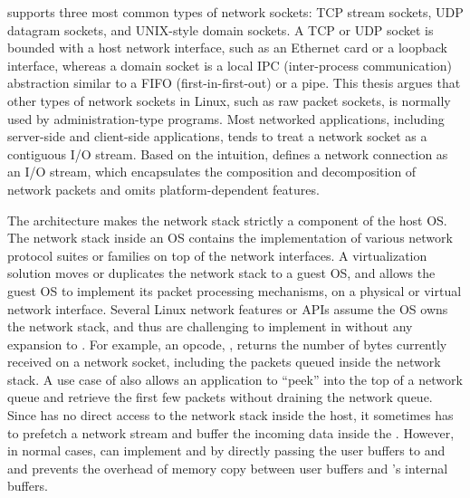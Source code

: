 \label{sec:libos:socket}

\thelibos{} supports three most common types of network sockets: TCP stream sockets, UDP datagram sockets, and UNIX-style domain sockets.
A TCP or UDP socket is bounded with a host network interface,
such as an Ethernet card or a loopback interface,
whereas a domain socket is a local IPC (inter-process communication) abstraction
similar to a FIFO (first-in-first-out) or a pipe.
This thesis argues that other types of network sockets
in Linux, such as raw packet sockets, is normally used by administration-type programs.
Most networked applications, including server-side and client-side applications, tends to treat a network socket
as a contiguous I/O stream. Based on the intuition,
\thehostabi{} defines a network connection as an I/O stream, which encapsulates the composition and decomposition of network packets
and omits platform-dependent features.

The \graphene{} architecture makes the network stack strictly a component of the host OS.
The network stack inside an OS contains the implementation of various network protocol suites or families on top of the network interfaces.
A virtualization solution moves or duplicates
the network stack to a guest OS,
and allows the guest OS to implement its packet processing mechanisms,
on a physical or virtual network interface.
Several Linux network features or APIs assume
the OS owns the network stack, and thus are challenging to implement in \thelibos{}
without any expansion to \thehostabi{}.
For example,
an  opcode, ,
returns the number of bytes currently received on a network socket, including the packets queued inside the network stack. 
A use case of  also allows an application
to ``peek'' into the top of a network queue
and retrieve the first few packets without draining the network queue.
Since \thelibos{} has no direct access to the network stack
inside the host,
it sometimes has to prefetch a network stream
and buffer the incoming data inside the \picoproc{}.
However, in normal cases, \thelibos{} can implement  and  by directly passing the user buffers to  and  and prevents the overhead of memory copy between user buffers and \thelibos{}'s internal buffers. 














